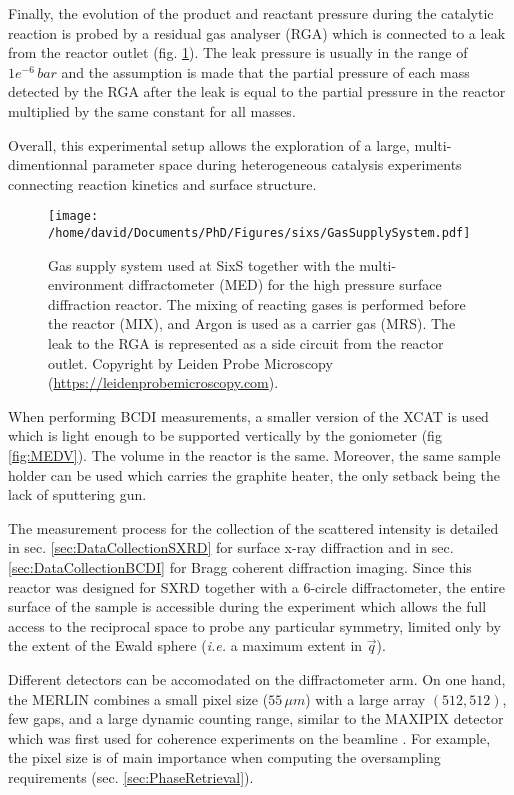 Finally, the evolution of the product and reactant pressure during the catalytic reaction is probed by a residual gas analyser (RGA) which is connected to a leak from the reactor outlet (fig. \ref{fig:GasSupplySystem}).
The leak pressure is usually in the range of $1e^{-6} \, \si{bar}$ and the assumption is made that the partial pressure of each mass detected by the RGA after the leak is equal to the partial pressure in the reactor multiplied by the same constant for all masses.

Overall, this experimental setup allows the exploration of a large, multi-dimentionnal parameter space during heterogeneous catalysis experiments connecting reaction kinetics and surface structure.

\begin{figure}[!htb]
    \centering
    \texttt{[image: /home/david/Documents/PhD/Figures/sixs/GasSupplySystem.pdf]}
    \caption{
    	Gas supply system used at SixS together with the multi-environment diffractometer (MED) for the high pressure surface diffraction reactor.
    	The mixing of reacting gases is performed before the reactor (MIX), and Argon is used as a carrier gas (MRS).
    	The leak to the RGA is represented as a side circuit from the reactor outlet.
    	Copyright by Leiden Probe Microscopy (\url{https://leidenprobemicroscopy.com}).
    }
    \label{fig:GasSupplySystem}
\end{figure}

When performing BCDI measurements, a smaller version of the XCAT is used which is light enough to be supported vertically by the goniometer (fig \ref{fig:MEDV}).
The volume in the reactor is the same.
Moreover, the same sample holder can be used which carries the graphite heater, the only setback being the lack of sputtering gun.

The measurement process for the collection of the scattered intensity is detailed in sec. \ref{sec:DataCollectionSXRD} for surface x-ray diffraction and in sec. \ref{sec:DataCollectionBCDI} for Bragg coherent diffraction imaging.
Since this reactor was designed for SXRD together with a 6-circle diffractometer, the entire surface of the sample is accessible during the experiment which allows the full access to the reciprocal space to probe any particular symmetry, limited only by the extent of the Ewald sphere (\textit{i.e.} a maximum extent in $\vec{q}$).

Different detectors can be accomodated on the diffractometer arm.
On one hand, the MERLIN \parencite{BEWLEY20061029} combines a small pixel size ($55 \, \mu m$) with a large array $(512, 512)$, few gaps, and a large dynamic counting range, similar to the MAXIPIX detector \parencite{ponchut_maxipix_2011} which was first used for coherence experiments on the beamline \parencite{Schavkan2013, Li2020}.
For example, the pixel size is of main importance when computing the oversampling requirements (sec. \ref{sec:PhaseRetrieval}).

